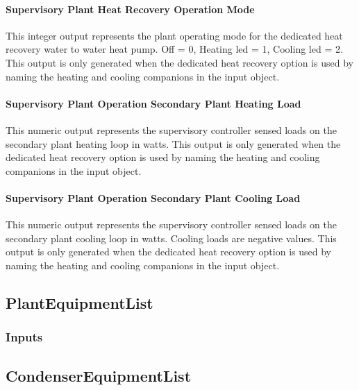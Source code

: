 \paragraph{Supervisory Plant Heat Recovery Operation Mode}\label{operation-scheme-outputs-hr-operation-mode}

This integer output represents the plant operating mode for the dedicated heat recovery water to water heat pump.  Off = 0, Heating led = 1, Cooling led = 2.  This output is only generated when the dedicated heat recovery option is used by naming the heating and cooling companions in the input object.

\paragraph{Supervisory Plant Operation Secondary Plant Heating Load}\label{operation-scheme-outputs-supervisory-secondary-plant-heating-loads}

This numeric output represents the supervisory controller sensed loads on the secondary plant heating loop in watts.  This output is only generated when the dedicated heat recovery option is used by naming the heating and cooling companions in the input object.

\paragraph{Supervisory Plant Operation Secondary Plant Cooling Load}\label{operation-scheme-outputs-supervisory-secondary-plant-cooling-loads}

This numeric output represents the supervisory controller sensed loads on the secondary plant cooling loop in watts.  Cooling loads are negative values. This output is only generated when the dedicated heat recovery option is used by naming the heating and cooling companions in the input object.

\subsection{PlantEquipmentList}\label{plantequipmentlist}

\subsubsection{Inputs}\label{inputs-14-009}

\subsection{CondenserEquipmentList}\label{condenserequipmentlist}

